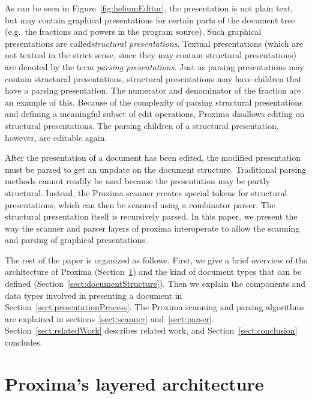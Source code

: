 \documentclass[12pt]{article}
\begin{document}
As can be seen in Figure~\ref{fig:heliumEditor}, the presentation is not plain text, but may contain graphical presentations for certain parts of the document tree (e.g.\ the fractions and powers in the program source). Such graphical presentations are called{\em structural presentations}. Textual presentations (which are not textual in the strict sense, since they may contain structural presentations) are denoted by the term {\em parsing presentations}. Just as parsing presentations may contain structural presentations, structural presentations may have children that have a parsing presentation. The numerator and denominator of the fraction are an example of this. Because of the complexity of parsing structural presentations and defining a meaningful subset of edit operations, Proxima disallows editing on structural presentations. The parsing children of a structural presentation, however, are editable again.

After the presentation of a document has been edited, the modified presentation must be parsed to get an unpdate on the document structure. Traditional parsing methods cannot readily be used because the presentation may be partly structural. Instead, the Proxima scanner creates special tokens for structural presentations, which can then be scanned using a combinator parser. The structural presentation itself is recursively parsed. In this paper, we present the way the scanner and parser layers of proxima interoperate to allow the scanning and parsing of graphical presentations.

The rest of the paper is organized as follows. First, we give a brief overview of the architecture of Proxima (Section~\ref{sect:architecture}) and the kind of document types that can be defined (Section~\ref{sect:documentStructure}). Then we explain the components and data types involved in presenting a document in Section~\ref{sect:presentationProcess}. The Proxima scanning and parsing algorithms are explained in sections~\ref{sect:scanner} and~\ref{sect:parser}. Section~\ref{sect:relatedWork} describes related work, and Section~\ref{sect:conclusion} concludes.






%
\section{Proxima's layered architecture} \label{sect:architecture}
%
\end{document}
